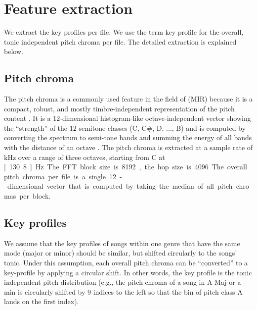 \documentclass{article}
\begin{document}
\section{Feature extraction}\label{sec:pitch_chroma}
We extract the key profiles per file. We use the term key profile for the overall, tonic independent pitch chroma per file. The detailed extraction is explained below.

\subsection{Pitch chroma}\label{subsec:pc_extract}
The pitch chroma is a commonly used feature in the field of (MIR) because it is a compact, robust, and mostly timbre-independent representation of the pitch content  \cite{muller_information_2007}. It is a $12$-dimensional histogram-like octave-independent vector showing the ``strength'' of the $12$ semitone classes (C, C\#, D, ..., B) and is computed by converting the spectrum to semi-tone bands and summing the energy of all bands with the distance of an octave \cite{fujishima_realtime_1999}. 
The pitch chroma is extracted at a sample rate of \unit[10]{kHz} over a range of three octaves, starting from C at \unit[130.8]{Hz}. The FFT block size is 8192, the hop size is 4096.
The overall pitch chroma per file is a single 12-dimensional vector that is computed by taking the median of all pitch chromas per block. 



\subsection{Key profiles}\label{sec:featureset}
We assume that the key profiles of songs within one genre that have the same mode (major or minor) should be similar, but shifted circularly to the songs' tonic. Under this assumption, each overall pitch chroma can be ``converted'' to a key-profile by applying a circular shift. In other words, the key profile is the tonic independent pitch distribution (e.g., the pitch chroma of a song in A-Maj or a-min is circularly shifted by $9$ indices to the left so that the bin of pitch class A lands on the first index).
\end{document}
